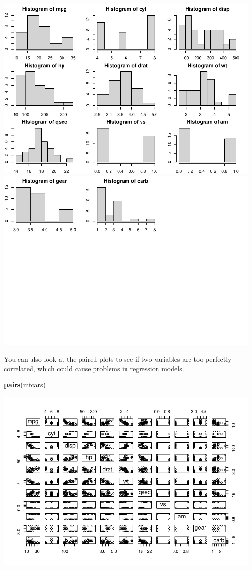 \documentclass[
]{book}
\newenvironment{Shaded}{\begin{snugshade}}{\end{snugshade}}
\newcommand{\FunctionTok}[1]{\textcolor[rgb]{0.13,0.29,0.53}{\textbf{#1}}}
\newcommand{\NormalTok}[1]{#1}
\begin{document}
\includegraphics{bookdown-demo_files/figure-latex/unnamed-chunk-4-1.pdf} \includegraphics{bookdown-demo_files/figure-latex/unnamed-chunk-4-2.pdf}

You can also look at the paired plots to see if two variables are too perfectly correlated, which could cause problems in regression models.

\begin{Shaded}
\begin{Highlighting}[]
\FunctionTok{pairs}\NormalTok{(mtcars)}
\end{Highlighting}
\end{Shaded}

\includegraphics{bookdown-demo_files/figure-latex/unnamed-chunk-5-1.pdf}
\end{document}
